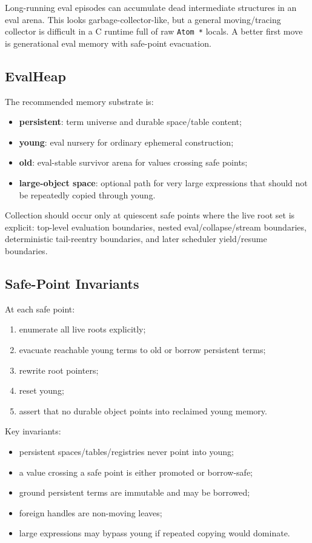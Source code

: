 \documentclass[11pt]{article}
\begin{document}
Long-running eval episodes can accumulate dead intermediate structures in an eval arena.  This looks garbage-collector-like, but a general moving/tracing collector is difficult in a C runtime full of raw \texttt{Atom *} locals.  A better first move is generational eval memory with safe-point evacuation.

\subsection{EvalHeap}

The recommended memory substrate is:

\begin{itemize}[leftmargin=*]
  \item \textbf{persistent}: term universe and durable space/table content;
  \item \textbf{young}: eval nursery for ordinary ephemeral construction;
  \item \textbf{old}: eval-stable survivor arena for values crossing safe points;
  \item \textbf{large-object space}: optional path for very large expressions that should not be repeatedly copied through young.
\end{itemize}

Collection should occur only at quiescent safe points where the live root set is explicit: top-level evaluation boundaries, nested eval/collapse/stream boundaries, deterministic tail-reentry boundaries, and later scheduler yield/resume boundaries.

\subsection{Safe-Point Invariants}

At each safe point:

\begin{enumerate}[leftmargin=*]
  \item enumerate all live roots explicitly;
  \item evacuate reachable young terms to old or borrow persistent terms;
  \item rewrite root pointers;
  \item reset young;
  \item assert that no durable object points into reclaimed young memory.
\end{enumerate}

Key invariants:

\begin{itemize}[leftmargin=*]
  \item persistent spaces/tables/registries never point into young;
  \item a value crossing a safe point is either promoted or borrow-safe;
  \item ground persistent terms are immutable and may be borrowed;
  \item foreign handles are non-moving leaves;
  \item large expressions may bypass young if repeated copying would dominate.
\end{itemize}
\end{document}
